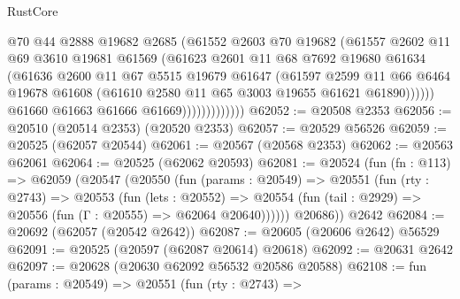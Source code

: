 \begin{lexlean}{RustCore}
\begin{coremodule}
                              @70
                              @44
                              @2888
                              @19682
                              @2685
                              (@61552
                                @2603
                                @70
                                @19682
                                (@61557
                                  @2602
                                  @11
                                  @69
                                  @3610
                                  @19681
                                  @61569
                                  (@61623
                                    @2601
                                    @11
                                    @68
                                    @7692
                                    @19680
                                    @61634
                                    (@61636
                                      @2600
                                      @11
                                      @67
                                      @5515
                                      @19679
                                      @61647
                                      (@61597
                                        @2599
                                        @11
                                        @66
                                        @6464
                                        @19678
                                        @61608
                                        (@61610 @2580 @11 @65 @3003 @19655 @61621 @61890))))))
                              @61660
                              @61663
                              @61666
                              @61669)))))))))))))
@62052 := @20508 @2353
@62056 := @20510 (@20514 @2353) (@20520 @2353)
@62057 := @20529 @56526
@62059 := @20525 (@62057 @20544)
@62061 := @20567 (@20568 @2353)
@62062 := @20563 @62061
@62064 := @20525 (@62062 @20593)
@62081 := @20524
    (fun (fn : @113) =>
    @62059
      (@20547
        (@20550
          (fun (params : @20549) =>
          @20551
            (fun (rty : @2743) =>
            @20553
              (fun (lets : @20552) =>
              @20554 (fun (tail : @2929) => @20556 (fun (Γ : @20555) => @62064 @20640))))))
        @20686))
    @2642
@62084 := @20692 (@62057 (@20542 @2642))
@62087 := @20605 (@20606 @2642) @56529
@62091 := @20525 (@20597 (@62087 @20614) @20618)
@62092 := @20631 @2642
@62097 := @20628 (@20630 @62092 @56532 @20586 @20588)
@62108 := fun (params : @20549) =>
  @20551
    (fun (rty : @2743) =>

\end{coremodule}
\end{lexlean}
